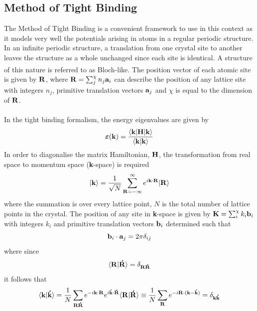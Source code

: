 \documentclass[a4paper, 12pt]{article}
\begin{document}
	\subsection{Method of Tight Binding}\label{tb}
	The Method of Tight Binding is a convenient framework to use in this context as it models very well the potentials arising in atoms in a regular periodic structure. 
	In an infinite periodic structure, a translation from one crystal site to another leaves the structure as a whole unchanged since each site is identical. A structure of this nature is referred to as Bloch-like\textsuperscript{\textcolor{blue}{\cite{kittel_1996}}}.
	The position vector of each atomic site is given by $\bf R$,
		where ${\bf R} = \sum_j^\chi n_j{\bf a}_i$ can describe the position of any lattice site with integers $n_j$, primitive translation vectors ${\bf a}_j$ and $\chi$ is equal to the dimension of $\bf R$. \\ 
		\\In the tight binding formalism, the energy eigenvalues are given by 
		\begin{equation}
			\bm\varepsilon({\bf k}) = \frac{\langle {\bf k}|{\bf H}|{\bf k} \rangle}{\langle\bf k|k\rangle}
		\end{equation}
		In order to diagonalise the matrix Hamiltonian, $\bf H$, the transformation from real space to momentum space ({\bf k}-space) is required
		\begin{equation}\label{kkk}
			|{\bf k}\rangle = \frac{1}{\sqrt{N}}\sum_{\bf R = -\infty}^\infty e^{i{\bf k}\cdot \bf R} |\bf R\rangle
		\end{equation}
		where the summation is over every lattice point, $N$ is the total number of lattice points in the crystal. The position of any site in {\bf k}-space is given by ${\bf K} = \sum_i^\chi k_i{\bf b}_i$ with integers $k_i$ and primitive translation vectors ${\bf b}_i$ determined such that 
		\begin{equation}
		{\bf b}_i\cdot {\bf a}_j = 2\pi \delta_{i j}
			\label{ab}
		\end{equation}
where since 
		\begin{equation}
			\langle{\bf R}|{\bf \acute{R}}\rangle = \delta_{\bf R \acute{R}}
		\end{equation}
		it follows that
		\begin{equation}
			\label{kk}
			\langle{\bf k}|{\bf \acute{k}}\rangle = \frac{1}{N}\sum_{\bf R \acute{R}} e^{-i{\bf k}\cdot{\bf R}}e^{i{\bf \acute{k}}\cdot{\bf \acute{R}}} \langle{\bf R | \acute{R}}\rangle \equiv \frac{1}{N}\sum_{\bf R} e^{-i{\bf R\cdot(k-\acute{k})}}=\delta_{\bf k \acute{k}}
		\end{equation}
\end{document}
